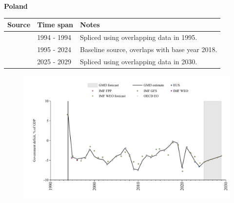 \documentclass[12pt,a4paper,landscape]{article}
\begin{document}
\begin{adjustbox}{max totalsize={\paperwidth}{\paperheight},center}
\begin{minipage}[t][\textheight][t]{\textwidth}
\vspace*{0.5cm}
{}
\begin{center}
{\Large\bfseries Poland}
\end{center}
\vspace{0.5cm}
\begin{table}[H]
\centering
\small
\begin{tabular}{|l|l|l|}
\hline
\textbf{Source} & \textbf{Time span} & \textbf{Notes} \\
\hline
\rowcolor{white}\cite{IMF_GFS}& 1994 - 1994 &Spliced using overlapping data in 1995.\\
\rowcolor{lightgray}\cite{EUS}& 1995 - 2024 &Baseline source, overlaps with base year 2018.\\
\rowcolor{white}\cite{IMF_WEO_forecast}& 2025 - 2029 &Spliced using overlapping data in 2030.\\
\hline
\end{tabular}
\end{table}
\begin{figure}[H]
\centering
\includegraphics[width=\textwidth,height=0.6\textheight,keepaspectratio]{graphs/POL_govdef_GDP.pdf}
\end{figure}
\end{minipage}
\end{adjustbox}
\end{document}
